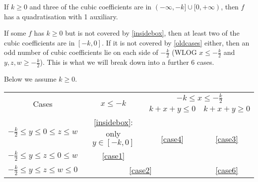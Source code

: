 \documentclass[11pt]{scrartcl}
\begin{document}
\begin{proposition}
	\label{insidebox}
If $k \ge 0$ and three of the cubic coefficients are in $(-\infty, -k] \cup [0, +\infty)$, then $f$ has a quadratisation with 1 auxiliary.
\end{proposition}

If some $f$ has $k \ge 0$ but is not covered by \ref{insidebox}, then at least two of the cubic coefficients are in $[-k, 0]$. 
If it is not covered by \ref{oldcases} either, then an odd number of cubic coefficients lie on each side of $-\frac{k}{2}$
(WLOG $x \le -\frac{k}{2}$ and $y, z, w \ge -\frac{k}{2}$). This is what we will break down into a further $6$ cases.

Below we assume $k \ge 0$.
\begin{table}[h!]
	\centering
	\begin{tabular}{|c|c|c|c|}
	\hline
	\multirow{2}{*}{Cases} &\multirow{2}{*}{$x \le -k$} &  \multicolumn{2}{c|}{$-k \le x \le -\frac{k}{2}$} \\\cline{3-4}
	
	& & $k + x + y \le 0$& $k + x + y \ge 0$ \\
		\hline 
		$ -\frac{k}{2} \le y \le 0 \le z \le w$ & \ref{insidebox}: only $y \in [-k,0]$ &  \multirow{2}{*}{\ref{case4}} & 
		 \multirow{2}{*}{\ref{case3}}\\\cline{1-2}
		$ -\frac{k}{2} \le y \le z \le 0 \le w$ &  \ref{case1}& &  \\
		\hline 
		$ -\frac{k}{2} \le y \le z \le w \le 0$ & \multicolumn{2}{c|}{\ref{case2}}  & \ref{case6} \\
		\hline
	\end{tabular}
\end{table}
\end{document}
